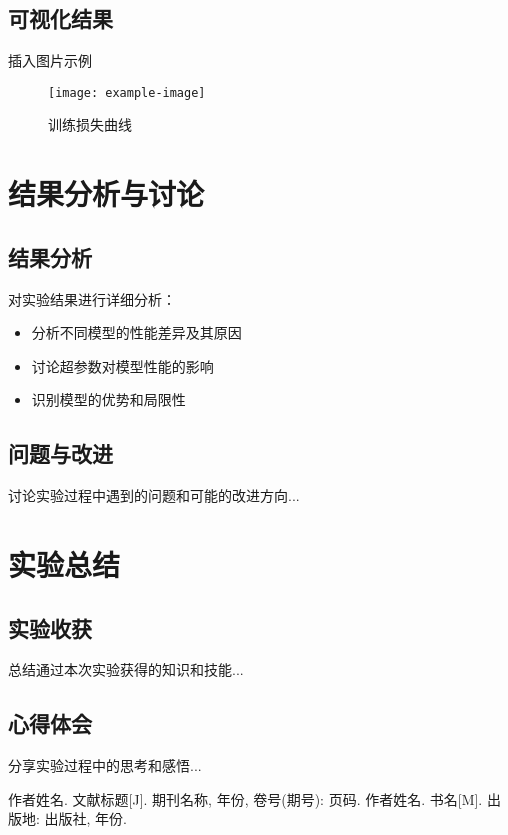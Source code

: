 \documentclass[a4paper,11pt]{article}
\begin{document}
\subsection{可视化结果}
插入图片示例
\begin{figure}[h]
    \centering
    \texttt{[image: example-image]}
    \caption{训练损失曲线}
    \label{fig:loss}
\end{figure}

\section{结果分析与讨论}
\subsection{结果分析}
对实验结果进行详细分析：
\begin{itemize}
    \item 分析不同模型的性能差异及其原因
    \item 讨论超参数对模型性能的影响
    \item 识别模型的优势和局限性
\end{itemize}

\subsection{问题与改进}
讨论实验过程中遇到的问题和可能的改进方向...

\section{实验总结}
\subsection{实验收获}
总结通过本次实验获得的知识和技能...

\subsection{心得体会}
分享实验过程中的思考和感悟...

\begin{thebibliography}{9}
 作者姓名. 文献标题[J]. 期刊名称, 年份, 卷号(期号): 页码.
 作者姓名. 书名[M]. 出版地: 出版社, 年份.
\end{thebibliography}
\end{document}

